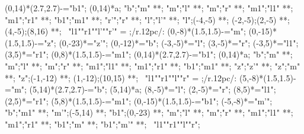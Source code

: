 {   (0,14)*\xycircle(2.7,2.7){-}="b1";
    (0,14)*{a};
         "b";"m" **\dir{-};
         "m";"l" **;
         "m";"r" **;
         "m1";"l1" **;
         "m1";"r1" **;
         "b1";"m1" **\dir{-};
         "r'";"r" **\dir{-};
         "l";"l'" **;
         "l";(-4,-5) **;
         (-2,-5);(2,-5) **;
         (4,-5);(8,16) **;
         \vtwist~{"l1"}{"r1"}{"l'"}{"r'"}
 \endxy
\quad = \quad
 ;/r.12pc/:
   (0,-8)*\xycircle(1.5,1.5){-}="m";
   (0,-15)*\xycircle(1.5,1.5){-}="z";
   (0,-23)*{}="z'";
   (0,-12)*{}="b";
   (-3,-5)*{}="l";
   (3,-5)*{}="r";
   (-3,5)*{}="l1";
   (3,5)*{}="r1";
   (0,8)*\xycircle(1.5,1.5){-}="m1";
   (0,14)*\xycircle(2.7,2.7){-}="b1";
    (0,14)*{a};
         "b";"m" **\dir{-};
         "m";"l" **;
         "m";"r" **;
         "m1";"l1" **;
         "m1";"r1" **;
         "b1";"m1" **\dir{-};
         "z";"z'" **\dir{-};
         "z";"m" **\dir{-};
         "z";(-1,-12) **;
         (1,-12);(10,15) **;
         \vtwist~{"l1"}{"r1"}{"l"}{"r"}
 \endxy
 \quad = \quad
  ;/r.12pc/:
   (5,-8)*\xycircle(1.5,1.5){-}="m";
   (5,14)*\xycircle(2.7,2.7){-}="b";
    (5,14)*{a};
   (8,-5)*{}="l";
   (2,-5)*{}="r";
   (8,5)*{}="l1";
   (2,5)*{}="r1";
   (5,8)*\xycircle(1.5,1.5){-}="m1";
   (0,-15)*\xycircle(1.5,1.5){-}="b1";
   (-5,-8)*{}="m'";
          "b";"m1" **\dir{-};
          "m'";(-5,14) **\dir{-};
          "b1";(0,-23) **\dir{-};
         "m";"l" **;
         "m";"r" **;
         "m1";"l1" **;
         "m1";"r1" **;
         "b1";"m" **;
         "b1";"m'" **;
         \vtwist~{"l1"}{"r1"}{"l"}{"r"};
 \endxy
 }

 \newcommand{\BUBimpliesTOi}{
  \def\objectstyle{\scriptstyle}
\xy
 (-10,-8)*{\bullet}="L";
 (10,-8)*{\bullet}="R";
 (0,8)*{\bullet}="T";
    "L";"T" **\dir{-};
    "R";"T" **\dir{-};
    "L";"R" **\dir{-};
 \endxy
\quad \xy {\ar^{\txt\bf{2-2}} (-5,0); (5,0)}; \endxy \quad
 \xy
 (-10,-8)*{\bullet}="L";
 (10,-8)*{\bullet}="R";
 (0,8)*{\bullet}="T";
 (0,-8)*{\bullet}="M";
    "L";"T" **\dir{-};
    "R";"T" **\dir{-};
    {\ar@/_1.5pc/@{-}"L";"R"};
    {\ar@{-}@/^1.5pc/ "L";"R"};
    "R";"M" **\dir{-};
    "L";"M" **\dir{-};
 \endxy
\quad \xy {\ar^{\txt\bf{Bubble}} (-8,0); (8,0)}; \endxy \;\;
  \xy
 (-10,-8)*{\bullet}="L";
 (10,-8)*{\bullet}="R";
 (0,8)*{\bullet}="T";
 (0,-8)*{\bullet}="M";
    "L";"T" **\dir{-};
    "R";"T" **\dir{-};
    {\ar@/_1.5pc/@{-}"L";"R"};
    "T";"M" **\dir{-};
    "R";"M" **\dir{-};
    "L";"M" **\dir{-};
 \endxy
}

